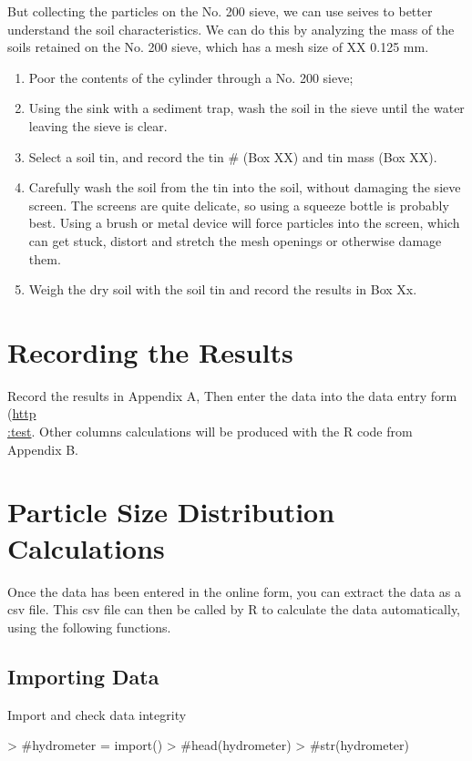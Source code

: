 \documentclass[12pt]{../SOP3_alpha}
\begin{document}
\NP But collecting the particles on the No. 200 sieve, we can use seives to better understand the soil characteristics. We can do this by analyzing the mass of the soils retained on the No. 200 sieve, which has a mesh size of XX 0.125 mm.  

\begin{enumerate}
	\item Poor the contents of the cylinder through a No. 200 sieve;
	\item Using the sink with a sediment trap, wash the soil in the sieve until the water leaving the sieve is clear. 
	\item Select a soil tin, and record the tin \# (Box XX) and tin mass (Box XX). 
	\item Carefully wash the soil from the tin into the soil, without damaging the sieve screen. The screens are quite delicate, so using a squeeze bottle is probably best. Using a brush or metal device will force particles into the screen, which can get stuck, distort and stretch the mesh openings or otherwise damage them. 
	\item Weigh the dry soil with the soil tin and record the results in Box Xx.
\end{enumerate}

\section{Recording the Results}

Record the results in Appendix A, Then enter the data into the data entry form (\href{test}{http\\:test}. Other columns calculations will be produced with the R code from Appendix B.  

\section{Particle Size Distribution Calculations}

Once the data has been entered in the online form, you can extract the data as a csv file. This csv file can then be called by R to calculate the data automatically, using the following functions. 

\subsection{Importing Data}

Import and check data integrity

\begin{Schunk}
\begin{Sinput}
> #hydrometer = import()
> #head(hydrometer)
> #str(hydrometer)
\end{Sinput}
\end{Schunk}
\end{document}
